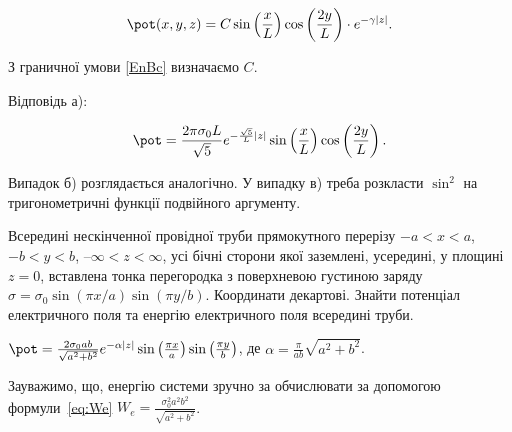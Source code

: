 \begin{problem}
\begin{solution}
	\begin{equation*}
		\pot (x,y,z) = C \sin\left( \frac{x}{L} \right)   \cos\left( \frac{2y}{L} \right)  \cdot e^{-\gamma |z|}.
	\end{equation*}

З граничної умови \eqref{EnBc} визначаємо $C$.

Відповідь а):

	\begin{equation*}
		\pot = \frac{2\pi\sigma_0 L}{\sqrt{5}}e^{-\frac{\sqrt{5}}{L}|z|}\sin\left( \frac{x}{L}\right) \cos\left( \frac{2y}{L}\right) .
	\end{equation*}
\end{solution}

Випадок б) розглядається аналогічно. У випадку в) треба розкласти $\sin^2$ на тригонометричні функції подвійного аргументу.

\end{problem}

\begin{problem}
Всередині нескінченної провідної труби прямокутного перерізу $-a<x<a$, $-b<y<b$, $–\infty<z<\infty$, усі бічні сторони якої заземлені, усередині, у площині $z=0$, вставлена тонка перегородка з поверхневою густиною заряду $\sigma  = {\sigma _0}\sin (\pi x/a)\sin (\pi y/b)$. Координати декартові. Знайти потенціал електричного поля та енергію електричного поля всередині труби.
\begin{solution}
	$\pot  = \frac{{2{\sigma _0}ab}}{{\sqrt {{a^2} + {b^2}} }}{e^{ - \alpha |z|}}\sin \left( {\frac{{\pi x}}{a}} \right)\sin \left( {\frac{{\pi y}}{b}} \right)$, де $\alpha  = \frac{\pi }{{ab}}\sqrt {{a^2} + {b^2}}$.

    Зауважимо, що, енергію системи зручно за обчислювати за допомогою формули~\eqref{eq:We}
	$W_e =  \frac{{\sigma _0^2{a^2}{b^2}}}{{\sqrt {{a^2} + {b^2}} }}$.
\end{solution}
\end{problem}

